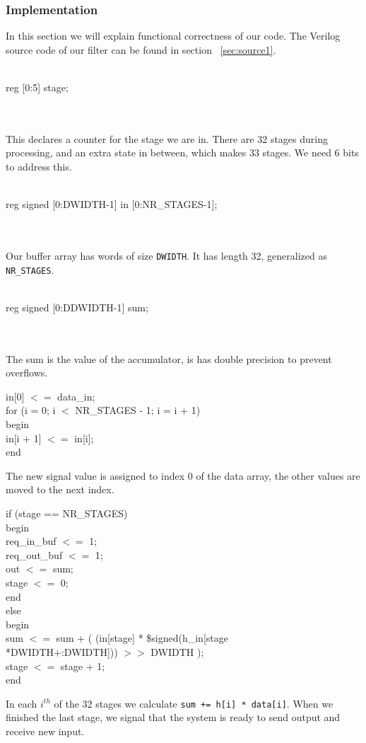 \subsubsection{Implementation}
In this section we will explain functional correctness of our code. The Verilog source code of our filter can be found in section ~\ref{sec:source1}. \\
\\
\centerline{reg [0:5] stage;}\\
\\
This declares a counter for the stage we are in. There are 32 stages during processing, and an extra state in between, which makes 33 stages. We need 6 bits to address this.\\
\\
\centerline{reg signed [0:DWIDTH-1] in [0:NR\_STAGES-1];}\\
\\
Our buffer array has words of size \texttt{DWIDTH}. It has length 32, generalized as \texttt{NR\_STAGES}.\\
\\
\centerline{reg signed [0:DDWIDTH-1] sum;}\\
\\
The sum is the value of the accumulator, is has double precision to prevent overflows.
\begin{center}
\parbox{8cm}{
 in[0] $<=$ data\_in; \\
for (i = 0; i $<$ NR\_STAGES - 1; i = i + 1) \\
begin \\
in[i + 1] $<=$ in[i]; \\
end \\
}
\end{center}
The new signal value is assigned to index 0 of the data array, the other values are moved to the next index.
\begin{center}
\parbox{10cm}{
if (stage == NR\_STAGES)\\
begin\\
\phantom{aaaa}req\_in\_buf $<=$ 1;\\
\phantom{aaaa}req\_out\_buf $<=$ 1;\\
\phantom{aaaa}out $<=$ sum;\\
\phantom{aaaa}stage $<=$ 0;\\
end\\
else\\
begin\\
\phantom{aaaa}sum $<=$ sum + ( (in[stage] * \$signed(h\_in[stage\\
\phantom{aaaa}\phantom{aaaa}*DWIDTH+:DWIDTH])) $>>$ DWIDTH );\\
\phantom{aaaa}stage $<=$ stage + 1;\\
end\\
}
\end{center}
In each $i^{th}$ of the 32 stages we calculate \texttt{sum += h[i] * data[i]}. When we finished the last stage, we signal that the system is ready to send output and receive new input.
